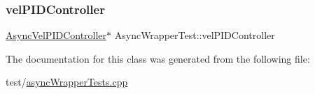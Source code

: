 \subsubsection{\texorpdfstring{velPIDController}{velPIDController}}
{\footnotesize\ttfamily \mbox{\hyperlink{classokapi_1_1AsyncVelPIDController}{Async\+Vel\+P\+I\+D\+Controller}}$\ast$ Async\+Wrapper\+Test\+::vel\+P\+I\+D\+Controller\hspace{0.3cm}{\ttfamily [protected]}}



The documentation for this class was generated from the following file\+:\begin{DoxyCompactItemize}
\item 
test/\mbox{\hyperlink{asyncWrapperTests_8cpp}{async\+Wrapper\+Tests.\+cpp}}\end{DoxyCompactItemize}
